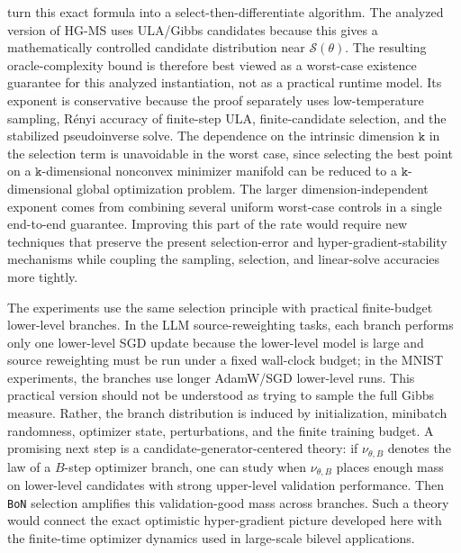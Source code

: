 \documentclass{article}
\theoremstyle{normaltheorem}
\newcommand{\dimk}{\texttt{k}}
\newcommand{\calS}{\mathcal{S}}
\newcommand{\BoN}{\texttt{BoN}\xspace}
\begin{document}
 turn this exact formula into a select-then-differentiate algorithm. The analyzed version of
\textsc{HG-MS} uses ULA/Gibbs candidates because this gives a mathematically controlled candidate distribution near
\(\calS(\theta)\). The resulting oracle-complexity bound is therefore best viewed as a worst-case existence guarantee for
this analyzed instantiation, not as a practical runtime model. Its exponent is conservative because the proof separately
uses low-temperature sampling, R\'enyi accuracy of finite-step ULA, finite-candidate selection, and the stabilized
pseudoinverse solve. The dependence on the intrinsic dimension \(\dimk\) in the selection term is unavoidable in the worst
case, since selecting the best point on a \(\dimk\)-dimensional nonconvex minimizer manifold can be reduced to a
\(\dimk\)-dimensional global optimization problem. The larger dimension-independent exponent comes from combining several
uniform worst-case controls in a single end-to-end guarantee. Improving this part of the rate would require new
techniques that preserve the present selection-error and hyper-gradient-stability mechanisms while coupling the sampling,
selection, and linear-solve accuracies more tightly.

The experiments use the same selection principle with practical finite-budget lower-level branches. In the LLM
source-reweighting tasks, each branch performs only one lower-level SGD update because the lower-level model is large and
source reweighting must be run under a fixed wall-clock budget; in the MNIST experiments, the branches use longer
AdamW/SGD lower-level runs. This practical version should not be understood as trying to sample the full Gibbs measure.
Rather, the branch distribution is induced by initialization, minibatch randomness, optimizer state, perturbations, and the
finite training budget. A promising next step is a candidate-generator-centered theory: if \(\nu_{\theta,B}\) denotes the
law of a \(B\)-step optimizer branch, one can study when \(\nu_{\theta,B}\) places enough mass on lower-level candidates
with strong upper-level validation performance. Then \BoN selection amplifies this validation-good mass across branches.
Such a theory would connect the exact optimistic hyper-gradient picture developed here with the finite-time optimizer
dynamics used in large-scale bilevel applications.





\clearpage
\onecolumn
\appendix
\begingroup
\makeatletter
\def\@endpart{\par\bigskip} %
\end{document}
